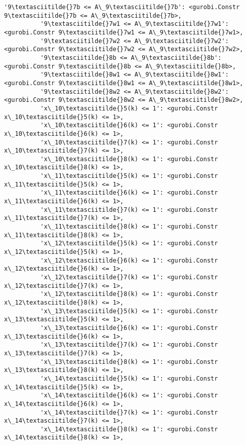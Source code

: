 \documentclass[11pt]{article}
\begin{document}
\begin{Verbatim}[commandchars=\\\{\}]
          '9\textasciitilde{}7b <= A\_9\textasciitilde{}7b': <gurobi.Constr 9\textasciitilde{}7b <= A\_9\textasciitilde{}7b>,
          '9\textasciitilde{}7w1 <= A\_9\textasciitilde{}7w1': <gurobi.Constr 9\textasciitilde{}7w1 <= A\_9\textasciitilde{}7w1>,
          '9\textasciitilde{}7w2 <= A\_9\textasciitilde{}7w2': <gurobi.Constr 9\textasciitilde{}7w2 <= A\_9\textasciitilde{}7w2>,
          '9\textasciitilde{}8b <= A\_9\textasciitilde{}8b': <gurobi.Constr 9\textasciitilde{}8b <= A\_9\textasciitilde{}8b>,
          '9\textasciitilde{}8w1 <= A\_9\textasciitilde{}8w1': <gurobi.Constr 9\textasciitilde{}8w1 <= A\_9\textasciitilde{}8w1>,
          '9\textasciitilde{}8w2 <= A\_9\textasciitilde{}8w2': <gurobi.Constr 9\textasciitilde{}8w2 <= A\_9\textasciitilde{}8w2>,
          'x\_10\textasciitilde{}5(k) <= 1': <gurobi.Constr x\_10\textasciitilde{}5(k) <= 1>,
          'x\_10\textasciitilde{}6(k) <= 1': <gurobi.Constr x\_10\textasciitilde{}6(k) <= 1>,
          'x\_10\textasciitilde{}7(k) <= 1': <gurobi.Constr x\_10\textasciitilde{}7(k) <= 1>,
          'x\_10\textasciitilde{}8(k) <= 1': <gurobi.Constr x\_10\textasciitilde{}8(k) <= 1>,
          'x\_11\textasciitilde{}5(k) <= 1': <gurobi.Constr x\_11\textasciitilde{}5(k) <= 1>,
          'x\_11\textasciitilde{}6(k) <= 1': <gurobi.Constr x\_11\textasciitilde{}6(k) <= 1>,
          'x\_11\textasciitilde{}7(k) <= 1': <gurobi.Constr x\_11\textasciitilde{}7(k) <= 1>,
          'x\_11\textasciitilde{}8(k) <= 1': <gurobi.Constr x\_11\textasciitilde{}8(k) <= 1>,
          'x\_12\textasciitilde{}5(k) <= 1': <gurobi.Constr x\_12\textasciitilde{}5(k) <= 1>,
          'x\_12\textasciitilde{}6(k) <= 1': <gurobi.Constr x\_12\textasciitilde{}6(k) <= 1>,
          'x\_12\textasciitilde{}7(k) <= 1': <gurobi.Constr x\_12\textasciitilde{}7(k) <= 1>,
          'x\_12\textasciitilde{}8(k) <= 1': <gurobi.Constr x\_12\textasciitilde{}8(k) <= 1>,
          'x\_13\textasciitilde{}5(k) <= 1': <gurobi.Constr x\_13\textasciitilde{}5(k) <= 1>,
          'x\_13\textasciitilde{}6(k) <= 1': <gurobi.Constr x\_13\textasciitilde{}6(k) <= 1>,
          'x\_13\textasciitilde{}7(k) <= 1': <gurobi.Constr x\_13\textasciitilde{}7(k) <= 1>,
          'x\_13\textasciitilde{}8(k) <= 1': <gurobi.Constr x\_13\textasciitilde{}8(k) <= 1>,
          'x\_14\textasciitilde{}5(k) <= 1': <gurobi.Constr x\_14\textasciitilde{}5(k) <= 1>,
          'x\_14\textasciitilde{}6(k) <= 1': <gurobi.Constr x\_14\textasciitilde{}6(k) <= 1>,
          'x\_14\textasciitilde{}7(k) <= 1': <gurobi.Constr x\_14\textasciitilde{}7(k) <= 1>,
          'x\_14\textasciitilde{}8(k) <= 1': <gurobi.Constr x\_14\textasciitilde{}8(k) <= 1>,

\end{Verbatim}
\end{document}
